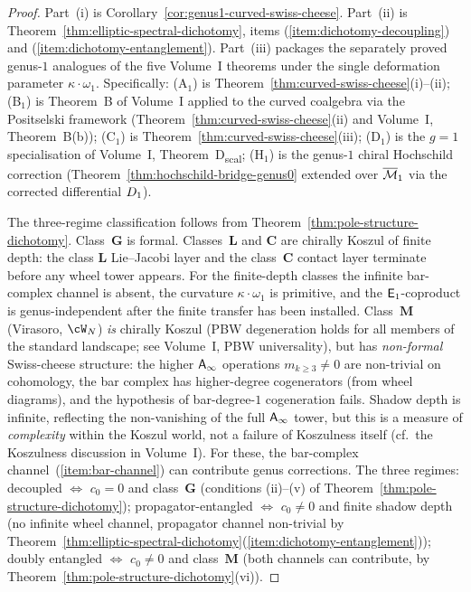 \begin{proof}
Part~(i) is
Corollary~\ref{cor:genus1-curved-swiss-cheese}.
Part~(ii) is
Theorem~\ref{thm:elliptic-spectral-dichotomy}, items
(\ref{item:dichotomy-decoupling}) and
(\ref{item:dichotomy-entanglement}).
Part~(iii) packages the separately proved genus-$1$ analogues of the
five Volume~I theorems under the single deformation parameter
$\kappa \cdot \omega_1$. Specifically:
(A$_1$) is
Theorem~\ref{thm:curved-swiss-cheese}(i)--(ii);
(B$_1$) is Theorem~B of Volume~I applied to the
curved coalgebra via the Positselski framework
(Theorem~\ref{thm:curved-swiss-cheese}(ii) and
Volume~I, Theorem~B(b));
(C$_1$) is Theorem~\ref{thm:curved-swiss-cheese}(iii);
(D$_1$) is the $g = 1$ specialisation of Volume~I,
Theorem~D\textsubscript{scal};
(H$_1$) is the genus-$1$ chiral Hochschild
correction
(Theorem~\ref{thm:hochschild-bridge-genus0}
extended over $\overline{\mathcal{M}}_1$ via the corrected differential
$D_{1}$).

The three-regime classification follows from
Theorem~\ref{thm:pole-structure-dichotomy}.
Class~$\mathbf{G}$ is formal. Classes~$\mathbf{L}$ and
$\mathbf{C}$ are chirally Koszul of finite depth: the class
$\mathbf{L}$ Lie--Jacobi layer and the class~$\mathbf{C}$
contact layer terminate before any wheel tower appears. For the
finite-depth classes the infinite bar-complex channel is absent,
the curvature $\kappa \cdot \omega_1$ is primitive, and the
$\mathsf{E}_1$-coproduct is genus-independent after the finite transfer
has been installed.
Class~$\mathbf{M}$ (Virasoro, $\cW_N$) \emph{is} chirally
Koszul (PBW degeneration holds for all members of the
standard landscape; see Volume~I,
PBW universality), but has
\emph{non-formal} Swiss-cheese structure: the higher
$\mathsf{A}_{\infty}$ operations $m_{k \ge 3} \ne 0$ are non-trivial
on cohomology, the bar complex has higher-degree
cogenerators (from wheel diagrams), and the hypothesis of
bar-degree-$1$ cogeneration fails. Shadow depth is
infinite, reflecting the non-vanishing of the full
$\mathsf{A}_{\infty}$ tower, but this is a measure of \emph{complexity}
within the Koszul world, not a failure of Koszulness itself
\textup{(}cf.\ the Koszulness discussion in Volume~I\textup{)}.
For these, the bar-complex
channel~(\ref{item:bar-channel}) can contribute genus
corrections.
The three regimes:
decoupled $\Leftrightarrow$ $c_0 = 0$ and class~$\mathbf{G}$
(conditions (ii)--(v) of
Theorem~\ref{thm:pole-structure-dichotomy});
propagator-entangled $\Leftrightarrow$ $c_0 \ne 0$ and
finite shadow depth (no infinite wheel channel,
propagator channel non-trivial by
Theorem~\ref{thm:elliptic-spectral-dichotomy}(\ref{item:dichotomy-entanglement}));
doubly entangled $\Leftrightarrow$ $c_0 \ne 0$ and
class~$\mathbf{M}$ (both channels can contribute, by
Theorem~\ref{thm:pole-structure-dichotomy}(vi)).
\end{proof}

